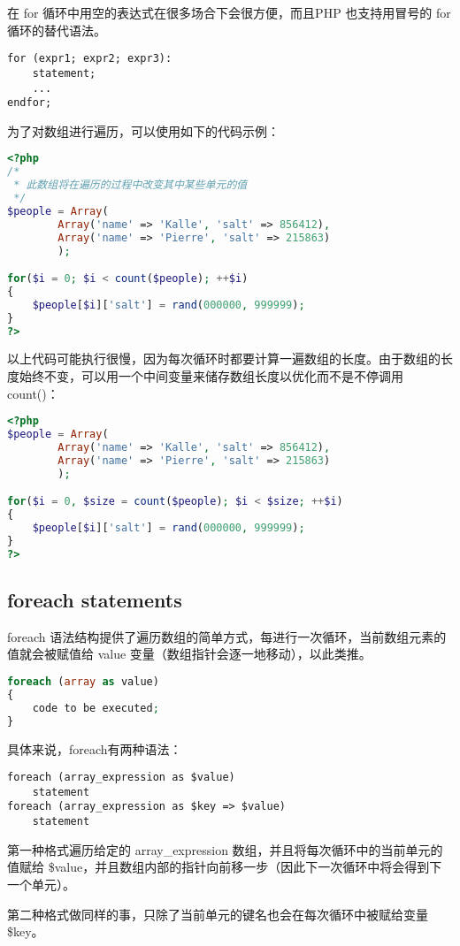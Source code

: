 在 for 循环中用空的表达式在很多场合下会很方便，而且PHP 也支持用冒号的 for 循环的替代语法。


\begin{verbatim}
for (expr1; expr2; expr3):
    statement;
    ...
endfor;
\end{verbatim}

为了对数组进行遍历，可以使用如下的代码示例：

\begin{lstlisting}[language=PHP]
<?php
/*
 * 此数组将在遍历的过程中改变其中某些单元的值
 */
$people = Array(
        Array('name' => 'Kalle', 'salt' => 856412), 
        Array('name' => 'Pierre', 'salt' => 215863)
        );

for($i = 0; $i < count($people); ++$i)
{
    $people[$i]['salt'] = rand(000000, 999999);
}
?>
\end{lstlisting}

以上代码可能执行很慢，因为每次循环时都要计算一遍数组的长度。由于数组的长度始终不变，可以用一个中间变量来储存数组长度以优化而不是不停调用 count()：

\begin{lstlisting}[language=PHP]
<?php
$people = Array(
        Array('name' => 'Kalle', 'salt' => 856412), 
        Array('name' => 'Pierre', 'salt' => 215863)
        );

for($i = 0, $size = count($people); $i < $size; ++$i)
{
    $people[$i]['salt'] = rand(000000, 999999);
}
?>
\end{lstlisting}


\subsection{foreach statements}



foreach 语法结构提供了遍历数组的简单方式，每进行一次循环，当前数组元素的值就会被赋值给 value 变量（数组指针会逐一地移动），以此类推。


\begin{lstlisting}[language=PHP]
foreach (array as value)
{
    code to be executed;
}
\end{lstlisting}

具体来说，foreach有两种语法：

\begin{verbatim}
foreach (array_expression as $value)
    statement
foreach (array_expression as $key => $value)
    statement
\end{verbatim}

\begin{compactitem}
\item 第一种格式遍历给定的 array\_expression 数组，并且将每次循环中的当前单元的值赋给 \$value，并且数组内部的指针向前移一步（因此下一次循环中将会得到下一个单元）。
\item 第二种格式做同样的事，只除了当前单元的键名也会在每次循环中被赋给变量 \$key。
\end{compactitem}

